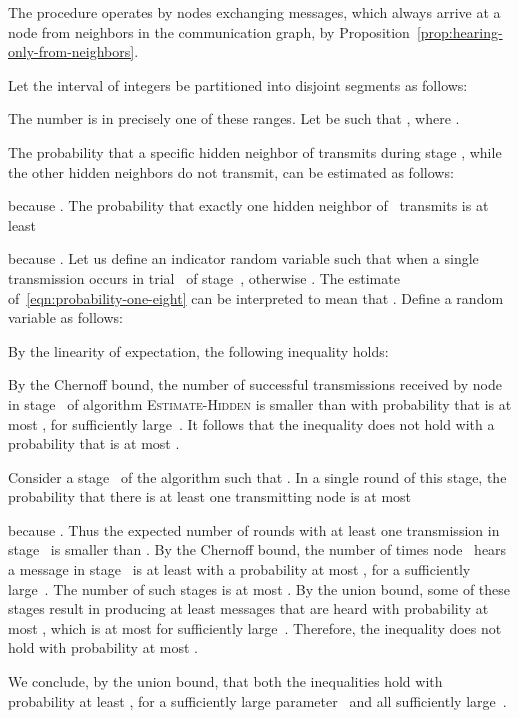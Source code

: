 \documentclass[11pt]{article}
\newcommand{\qed}{\hfill  \smallskip}
\newenvironment{proof}{\noindent{\bf Proof:}}{\qed}
\begin{document}
\begin{proof}  
The procedure operates by nodes exchanging messages, which always arrive at a node from neighbors in the communication graph, by Proposition~\ref{prop:hearing-only-from-neighbors}.

Let the interval of integers  be partitioned into disjoint segments as follows:
 
The number  is in precisely one of these ranges.
Let  be such that , where .

The probability that a specific hidden neighbor of  transmits during stage , while the other hidden neighbors do not transmit, can be estimated as follows: 
 
because .
The probability that exactly one hidden neighbor of~ transmits is  at least  

because  .
Let us define an indicator random variable  such that  when a single transmission occurs in trial~ of stage~, otherwise . 
The estimate of~\eqref{eqn:probability-one-eight} can be interpreted to mean that  .
Define a random variable  as follows:

By the linearity of expectation, the following inequality holds: 
 
By the Chernoff bound, the number of successful transmissions received by node~ in  stage~ of algorithm \textsc{Estimate-Hidden} is smaller than  with probability that is at most , for sufficiently large~.
It follows that the inequality  does not hold with a probability that is at most .

Consider a stage~ of the algorithm such that .
In a single round of this stage, the probability that there is at least one transmitting node is at most 

because .
Thus the expected number of rounds with at least one transmission in stage~ is smaller than  
.
By the Chernoff bound, the number of times  node~ hears a message in stage~ is at least  with a probability at most , for a sufficiently large~.
The number of such stages is at most .
By the union bound, some of these stages result in producing at least   messages that are heard with probability at most , which is at most  for sufficiently large~.
Therefore, the inequality  does not hold  with probability at most .

We conclude, by the union bound,  that both the inequalities    hold  with probability at least , for a sufficiently large parameter~ and all sufficiently large~.
\end{proof} 
\end{document}
